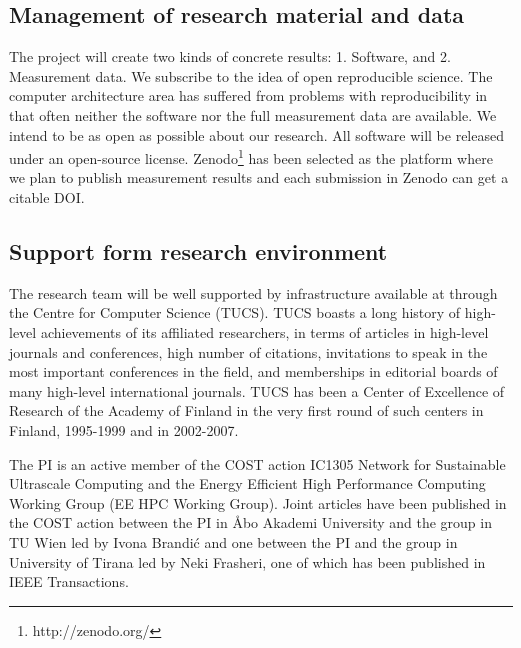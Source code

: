 \documentclass{article}
\begin{document}
\subsection{Management of research material and data}
The project will create two kinds of concrete results: 1. Software, and 2. Measurement data. 
We subscribe to the idea of open reproducible science. 
The computer architecture area has suffered from problems with reproducibility in that often neither the software nor the full measurement data are available. 
We intend to be as open as possible about our research. 
All software will be released under an open-source license. 
Zenodo\footnote{http://zenodo.org/} has been selected as the platform where we plan to publish measurement results and each submission in Zenodo can get a citable DOI.

\subsection{Support form research environment}
The research team will be well supported by infrastructure available at through the Centre for Computer Science (TUCS).
TUCS boasts a long history of high-level achievements of its affiliated researchers, in terms of articles in high-level journals and conferences, high number of citations, 
invitations to speak in the most important conferences in the field, and memberships in editorial boards of many high-level international journals. 
TUCS has been a Center of Excellence of Research of the Academy of Finland in the very first round of such centers in Finland, 1995-1999 and in 2002-2007. 


The PI is an active member of the COST action IC1305 Network for Sustainable Ultrascale Computing and the Energy Efficient High Performance Computing Working Group (EE HPC Working Group). 
Joint articles have been published in the COST action between the PI in \AA{}bo Akademi University and the group in TU Wien led by Ivona Brandi\'{c} and one between the PI and the group in University of Tirana led by Neki Frasheri, one of which has been published in IEEE Transactions.\smallskip
\end{document}

